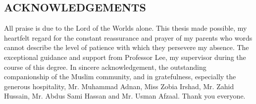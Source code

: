 \begin{center}
\section*{ACKNOWLEDGEMENTS}
\end{center}
\thispagestyle{empty}

All praise is due to the Lord of the Worlds alone. This thesis made possible, my heartfelt regard for the constant reassurance and prayer of my parents who words cannot describe the level of patience with which they persevere my absence. The exceptional guidance and support from Professor Lee, my supervisor during the course of this degree. In sincere acknowledgement, the outstanding companionship of the Muslim community, and in gratefulness, especially the generous hospitality, Mr. Muhammad Adnan, Miss Zobia Irshad, Mr. Zahid Hussain, Mr. Abdus Sami Hassan and Mr. Usman Afzaal. Thank you everyone.


\pagebreak
